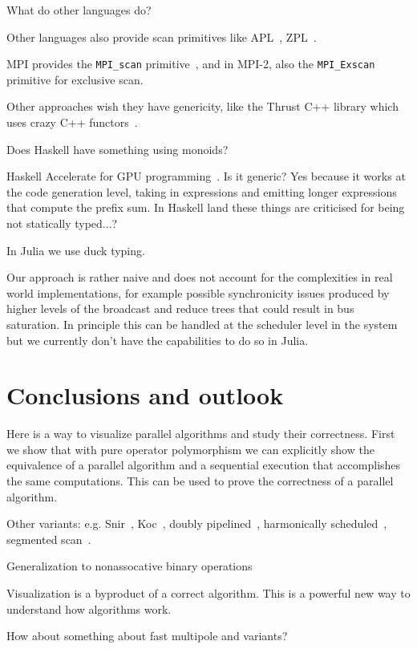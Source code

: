 \documentclass{sig-alternate}
\newcommand{\code}[1]{\texttt{#1}}
\begin{document}
What do other languages do?

Other languages also provide scan primitives like APL~\cite{Iverson1962}, ZPL~\cite{Chamberlain2000}.

MPI provides the \code{MPI\_scan} primitive~\cite{Snir1995,MPI}, and in MPI-2, also the \code{MPI\_Exscan} primitive for exclusive scan.~\cite{MPI2}

Other approaches wish they have genericity, like the Thrust C++ library which uses crazy C++ functors~\cite{Bell2012}.

Does Haskell have something using monoids?

Haskell Accelerate for GPU programming~\cite{Chakravarty2011}. Is it generic? Yes because it works at the code generation level, taking in expressions and emitting longer expressions that compute the prefix sum. In Haskell land these things are criticised for being not statically typed...?

In Julia we use duck typing.

Our approach is rather naive and does not account for the complexities in real world implementations, for example possible synchronicity issues produced by higher levels of the broadcast and reduce trees that could result in bus saturation. In principle this can be handled at the scheduler level in the system but we currently don't have the capabilities to do so in Julia.

\section{Conclusions and outlook}

Here is a way to visualize parallel algorithms and study their correctness. First we show that with pure operator polymorphism we can explicitly show the equivalence of a parallel algorithm and a sequential execution that accomplishes the same computations. This can be used to prove the correctness of a parallel algorithm.

Other variants: e.g. Snir~\cite{Kruskal1985}, Koc~\cite{Egecioglu1992}, doubly pipelined~\cite{Sanders2006}, harmonically scheduled~\cite{Wang1996}, segmented scan~\cite{Sengupta2007}.

Generalization to nonassocative binary operations~\cite{Chen1992}

Visualization is a byproduct of a correct algorithm. This is a powerful new way to understand how algorithms work.

How about something about fast multipole and variants?
\end{document}
